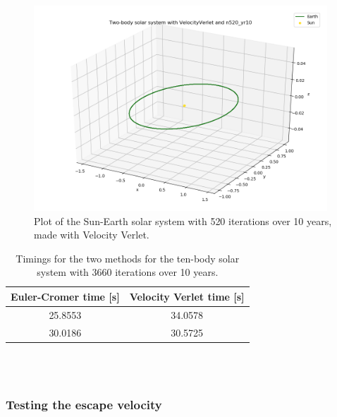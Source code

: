 \documentclass{article}
\begin{document}
    \begin{figure}[H]
        \centering
        \includegraphics[width = 11cm]{img/plot3D_S_E_V_n520_yr10.png}
        \caption{Plot of the Sun-Earth solar system with 520 iterations over 10 years, made with Velocity Verlet. }
        \label{fig:plot3D_S_E_V_n520_yr10}
    \end{figure}

    \begin{table}[H]
        \centering
        \caption{Timings for the two methods for the ten-body solar system with 3660 iterations over 10 years.}
        \vspace{2mm}
        \label{tab:timings}
        \begin{tabular}{|c|c|}
            \hline
            Euler-Cromer time [s] & Velocity Verlet time [s] \\
            \hline \hline
            25.8553 & 34.0578 \\
            30.0186 & 30.5725 \\
            \hline
        \end{tabular} \\
        \hspace{0pt}\\
    \end{table}


\subsubsection{Testing the escape velocity}
\end{document}

